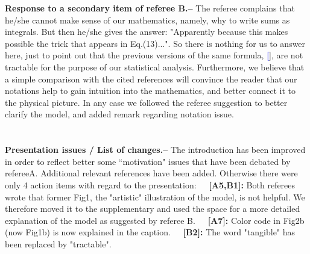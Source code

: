 \documentclass[aps,prl,floats,floatfix,twocolumn]{revtex4}
\newcommand{\sect}[1]{{\bf #1.-- }}
\renewcommand{\cite}[1]{\textcolor{blue}{[\onlinecite{#1}}]} %
\begin{document}
\sect{Response to a secondary item of referee B}
%
The referee complains that he/she cannot make sense of our mathematics, namely, why to write sums as integrals. But then he/she gives the answer: \textsf{"Apparently because this makes possible the trick that appears in Eq.(13)...".}
%
So there is nothing for us to answer here, just to point out that the previous versions of the same formula, \cite{Wichmann,Roling1,Nitzan,ner}, are not tractable for the purpose of our statistical analysis.  Furthermore, we believe that a simple comparison with the cited references will convince the reader that our notations help to gain intuition into the mathematics, and better connect it to the physical picture.
%
In any case we followed the referee suggestion to better clarify the model, and added 
remark regarding notation issue. \\


\ \\ \ \\


\sect{Presentation issues / List of changes}
%
The introduction has been improved in order to reflect better 
some ``motivation" issues that have been debated by refereeA.
Additional relevant references have been added. 
Otherwise there were only 4 action items with regard to the presentation:
%
{\bf \ \ [A5,B1]:}
Both referees wrote that former Fig1, the "artistic" illustration of the model, is not helpful. 
We therefore moved it to the supplementary and used the space for a more detailed explanation of the model as suggested by referee B.
%
{\bf \ \ [A7]:}
Color code in Fig2b (now Fig1b) is now explained in the caption.
%
{\bf \ \ [B2]:}
The word "tangible" has been replaced by "tractable". 


\clearpage
\end{document}
